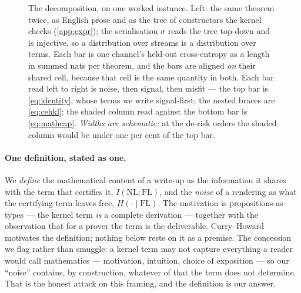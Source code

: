 \begin{figure}[t]
\centering

\caption{The decomposition, on one worked instance.
Left: the same theorem twice, as English prose and as the tree of \Expr{}
constructors the kernel checks (\cref{app:expr});
the serialisation $\sigma$ reads the tree top-down and is injective, so a
distribution over streams is a distribution over terms.
Each bar is one channel's held-out cross-entropy as a length in summed nats per
theorem, and the bars are aligned \emph{on} their shared cell, because that cell
is the same quantity in both.
Each bar read left to right is noise, then signal, then misfit --- the top bar
is \cref{eq:identity}, whose terms we write signal-first;
the nested braces are \cref{eq:cehkl}; the shaded column read against
the bottom bar is \cref{eq:mathcap}.
\emph{Widths are schematic:} at the de-risk orders the shaded column would be
under one per cent of the top bar.}
\label{fig:identity}
\end{figure}

\paragraph{One definition, stated as one.}
We \emph{define} the mathematical content of a write-up as the information it
shares with the term that certifies it, \(I(\mathrm{NL};\mathrm{FL})\), and the
\emph{noise} of a rendering as what the certifying term leaves free,
\(H(\cdot\mid\mathrm{FL})\).
The motivation is propositions-as-types --- the kernel term \emph{is} a complete
derivation \citep{curry1934functionality, Howard1980} --- together with the
observation that for a prover the term is the deliverable.
Curry--Howard motivates the definition; nothing below rests on it as a premise.
The concession we flag rather than smuggle:
a kernel term may not capture everything a reader would call mathematics ---
motivation, intuition, choice of exposition --- so our ``noise'' contains, by
construction, whatever of that the term does not determine.
That is the honest attack on this framing, and the definition is our answer.

